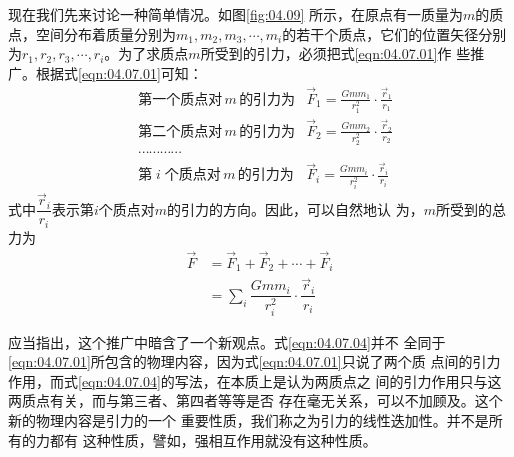 现在我们先来讨论一种简单情况。如图\ref{fig:04.09}
所示，在原点有一质量为$ m $的质点，空间分布着质量分别为$ m _ { 1 } , m _ { 2 } , m _ { 3 } , \cdots , m _ { i } $的若干个质点，它们的位置矢径分别为$ r _ { 1 } , r _ { 2 } ,
  r _ { 3 } , \cdots , r _ { i } $。为了求质点$ m $所受到的引力，必须把式\eqref{eqn:04.07.01}作
些推广。根据式\eqref{eqn:04.07.01}可知：
{\setlength{\mathindent}{2em}
\begin{equation}\label{eqn:04.07.03}
  \begin{aligned}
    & \text{第一个质点对}\,m\,\text{的引力为}
            & \vec{F} _ { 1 } = \frac { G m m _ { 1 } } { r _ 1 ^ { 2 } } \cdot \frac { \vec{r} _ { 1 } } { r _ { 1 } } \\
    & \text{第二个质点对}\,m\,\text{的引力为}
            & \vec{F} _ { 2 } = \frac { G m m _ { 2 } } { r _ 2 ^ { 2 } } \cdot \frac { \vec{r} _ { 2 } } { r _ { 2 } } \\
     & \cdots \cdots \cdots \cdots                                                                               \\
    & \text{第}\;i\;\text{个质点对}\,m\,\text{的引力为}
            & \vec{F} _ { i } = \frac { G m m _ { i } } { r _ i ^ { 2 } } \cdot \frac { \vec{r} _ { i } } { r _ { i } }
  \end{aligned}
\end{equation}}%
式中$ \dfrac { \vec{r} _ { i } } { r _ { i } } $表示第$ i $个质点对$ m $的引力的方向。因此，可以自然地认
为，$ m $所受到的总力为
\begin{equation}\label{eqn:04.07.04}
  \begin{aligned}
    \vec{F} & =  \vec{F} _ { 1 } + \vec{F} _ { 2 } + \cdots + \vec{F} _ { i }                                        \\
                                                                              & = \sum _ i { \dfrac { G m m _ { i } } { r _ { i } ^ 2 } \cdot \dfrac { \vec{r} _ { i } } { r _ { i } } }
  \end{aligned}
\end{equation}

应当指出，这个推广中暗含了一个新观点。式\eqref{eqn:04.07.04}并不
全同于\eqref{eqn:04.07.01}所包含的物理内容，因为式\eqref{eqn:04.07.01}只说了两个质
点间的引力作用，而式\eqref{eqn:04.07.04}的写法，在本质上是认为两质点之
间的引力作用只与这两质点有关，而与第三者、第四者等等是否
存在毫无关系，可以不加顾及。这个新的物理内容是引力的一个
重要性质，我们称之为引力的线性迭加性。并不是所有的力都有
这种性质，譬如，强相互作用就没有这种性质。

